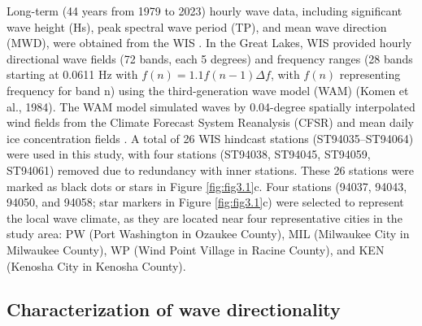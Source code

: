 Long-term (44 years from 1979 to 2023) hourly wave data, including significant
wave height (Hs), peak spectral wave period (TP), and mean wave direction (MWD),
were obtained from the WIS \citep{hubertz_wind-waves_1991}. In the Great Lakes,
WIS provided hourly directional wave fields (72 bands, each 5 degrees) and
frequency ranges (28 bands starting at 0.0611 Hz with $f(n)=1.1f(n-1)\Delta f$,
with $f(n)$ representing frequency for band n) using the third-generation wave
model (WAM) (Komen et al., 1984). The WAM model simulated waves by 0.04-degree
spatially interpolated wind fields from the Climate Forecast System Reanalysis
(CFSR) \citep{saha_ncep_2010,saha_ncep_2014} and mean daily ice concentration
fields \citep{yang_consistent_2020}. A total of 26 WIS hindcast stations
(ST94035–ST94064) were used in this study, with four stations (ST94038, ST94045,
ST94059, ST94061) removed due to redundancy with inner stations. These 26
stations were marked as black dots or stars in Figure \ref{fig:fig3.1}c. Four
stations (94037, 94043, 94050, and 94058; star markers in Figure
\ref{fig:fig3.1}c) were selected to represent the local wave climate, as they
are located near four representative cities in the study area: PW (Port
Washington in Ozaukee County), MIL (Milwaukee City in Milwaukee County), WP
(Wind Point Village in Racine County), and KEN (Kenosha City in Kenosha County).

\subsection{Characterization of wave directionality}

